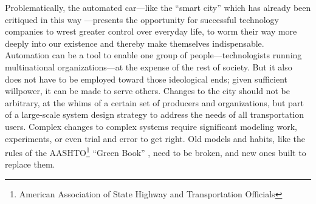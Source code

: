 Problematically, the automated car---like the
``smart city'' which has already been critiqued in this
way \cite{greenfieldSmart}---presents the opportunity for successful technology
companies to wrest greater control over everyday life, to worm their
way more deeply into our existence and thereby make themselves
indispensable. Automation can be a tool to enable one group of
people---technologists running multinational organizations---at the
expense of the rest of society.
But it also does not have to be employed toward those ideological
ends; given sufficient willpower, it can be made to serve others.
Changes to the city
should not be arbitrary, at the whims of a certain set of
producers and organizations, but part of a large-scale system design
strategy to address the needs of all transportation users. Complex
changes to complex systems require significant modeling work,
experiments, or even trial and error to get right. Old models and
habits, like the rules of the AASHTO\footnote{American Association of
  State Highway and Transportation Officials} ``Green
Book'' \cite[p. 181, 183]{swopeTrenton}, need to be broken, and new
ones built to replace them. 






